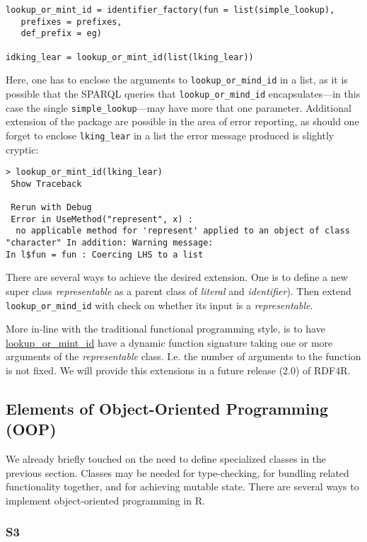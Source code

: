 \begin{lstlisting}[style=customr]
lookup_or_mint_id = identifier_factory(fun = list(simple_lookup),
   prefixes = prefixes,
   def_prefix = eg)

idking_lear = lookup_or_mint_id(list(lking_lear))
\end{lstlisting}

Here, one has to enclose the arguments to {\tt lookup\_or\_mind\_id} in a list, as it is possible that the SPARQL queries that {\tt lookup\_or\_mind\_id} encapsulates---in this case the single {\tt simple\_lookup}---may have more that one parameter. Additional extension of the package are possible in the area of error reporting, as should one forget to enclose {\tt lking\_lear} in a list the error message produced is slightly cryptic:

\begin{lstlisting}[style=customr]
> lookup_or_mint_id(lking_lear)
 Show Traceback
 
 Rerun with Debug
 Error in UseMethod("represent", x) : 
  no applicable method for 'represent' applied to an object of class "character" In addition: Warning message:
In l$fun = fun : Coercing LHS to a list
\end{lstlisting}

There are several ways to achieve the desired extension. One is to define a new super class \emph{representable} as a parent class of \emph{literal} and \emph{identifier}). Then extend {\tt lookup\_or\_mind\_id} with check on whether its input is a \emph{representable}.

More in-line with the traditional functional programming style, is to have \url{lookup\_or\_mint\_id} have a dynamic function signature taking one or more arguments of the \emph{representable} class. I.e. the number of arguments to the function is not fixed. We will provide this extensions in a future release (2.0) of RDF4R.

\subsection{Elements of Object-Oriented Programming (OOP)}

We already briefly touched on the need to define specialized classes in the previous section. Classes may be needed for type-checking, for bundling related functionality together, and for achieving mutable state. There are several ways to implement object-oriented programming in R.

\subsubsection{S3}


